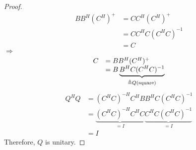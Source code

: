 \begin{multicols}{2}
\begin{proof}
    \[
        \begin{array}{ll}
            BB^H(C^H)^+ &= CC^H(C^H)^{+} \\
            &= CC^HC(C^HC)^{-1} \\
            &= C
        \end{array}
    \]
    $\Longrightarrow$ 
    \[
        \begin{array}{ll}
            C &= BB^H(C^H)^+ \\
            &= B\underbrace{B^HC(C^HC)^{-1}}_{\triangleq Q (\text{\rm square})}
        \end{array}
    \]
    \[
        \begin{array}{ll}
            Q^HQ &= (C^HC)^{-H}C^HBB^HC(C^HC)^{-1} \\
            &= \underbrace{(C^HC)^{-H}C^HC}_{=I}\underbrace{C^HC(C^HC)^{-1}}_{=I} \\
            &= I
        \end{array}
    \]
    Therefore, $Q$ is unitary.
\end{proof}

\newpage
\end{multicols}